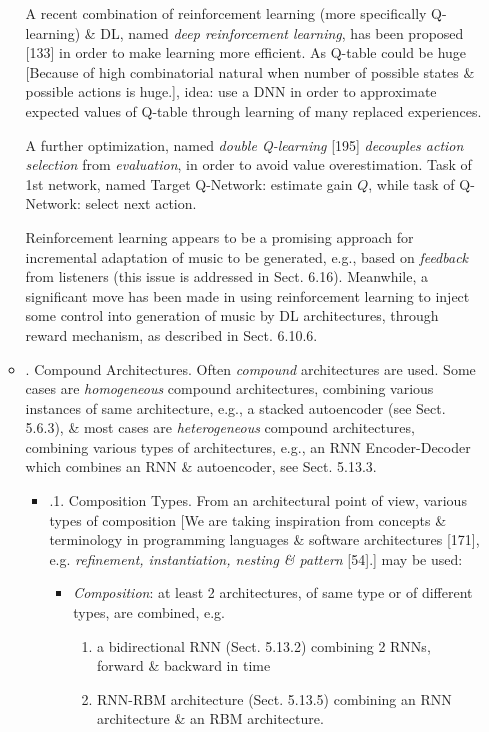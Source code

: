 \documentclass{article}
\begin{document}
\begin{itemize}
\begin{itemize}
		A recent combination of reinforcement learning (more specifically Q-learning) \& DL, named {\it deep reinforcement learning}, has been proposed [133] in order to make learning more efficient. As Q-table could be huge [Because of high combinatorial natural when number of possible states \& possible actions is huge.], idea: use a DNN in order to approximate expected values of Q-table through learning of many replaced experiences.

		A further optimization, named {\it double Q-learning} [195] {\it decouples action selection} from {\it evaluation}, in order to avoid value overestimation. Task of 1st network, named Target Q-Network: estimate gain $Q$, while task of Q-Network: select next action.

		Reinforcement learning appears to be a promising approach for incremental adaptation of music to be generated, e.g., based on {\it feedback} from listeners (this issue is addressed in Sect. 6.16). Meanwhile, a significant move has been made in using reinforcement learning to inject some control into generation of music by DL architectures, through reward mechanism, as described in Sect. 6.10.6.
		\item {. Compound Architectures.} Often {\it compound} architectures are used. Some cases are {\it homogeneous} compound architectures, combining various instances of same architecture, e.g., a stacked autoencoder (see Sect. 5.6.3), \& most cases are {\it heterogeneous} compound architectures, combining various types of architectures, e.g., an RNN Encoder-Decoder which combines an RNN \& autoencoder, see Sect. 5.13.3.
		\begin{itemize}
			\item {.1. Composition Types.} From an architectural point of view, various types of composition [We are taking inspiration from concepts \& terminology in programming languages \& software architectures [171], e.g. {\it refinement, instantiation, nesting \& pattern} [54].] may be used:
			\begin{itemize}
				\item {\it Composition}: at least 2 architectures, of same type or of different types, are combined, e.g.
				\begin{enumerate}
					\item a bidirectional RNN (Sect. 5.13.2) combining 2 RNNs, forward \& backward in time
					\item RNN-RBM architecture (Sect. 5.13.5) combining an RNN architecture \& an RBM architecture.
				\end{enumerate}

\end{itemize}
\end{itemize}
\end{itemize}
\end{itemize}
\end{document}
